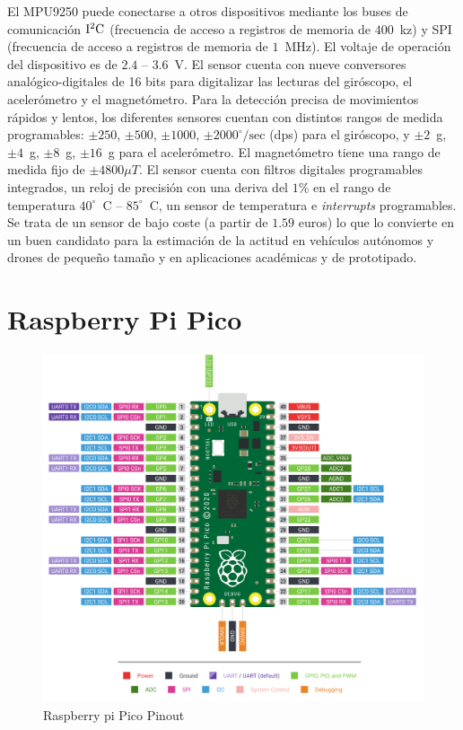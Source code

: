 \documentclass[a4paper,12pt]{book}
\begin{document}
El MPU9250 puede conectarse a otros dispositivos mediante los buses de comunicación $\rm{I^2C}$ (frecuencia de acceso a registros de memoria de $400$~kz) y SPI (frecuencia de acceso a registros de memoria de $1$~MHz). El voltaje de operación del dispositivo es de $2.4$ -- $3.6$~V. El sensor cuenta con nueve conversores analógico-digitales de 16 bits para digitalizar las lecturas del giróscopo, el acelerómetro y el magnetómetro. Para la detección precisa de movimientos rápidos y lentos, los diferentes sensores cuentan con distintos rangos de medida programables: $\pm 250$, $\pm 500$, $\pm 1000$, $\pm 2000^\circ/\mathrm{sec}$ (dps) para el giróscopo, y  $\pm 2$~g, $\pm 4$~g, $\pm 8$~g, $\pm 16$~g para el acelerómetro. El magnetómetro tiene una rango de medida fijo de $\pm4800 \mu T$. El sensor cuenta con filtros digitales programables integrados, un reloj de precisión con una deriva del $1\%$ en el rango de temperatura $40^\circ$~C -- $85^\circ$~C, un sensor de temperatura e \emph{interrupts} programables. Se trata de un sensor de bajo coste (a partir de $1.59$ euros) lo que lo convierte en un buen candidato para la estimación de la actitud en vehículos autónomos y drones de pequeño tamaño y en aplicaciones académicas y de prototipado.


\section{Raspberry Pi Pico}

\begin{figure}[!h]
    \centering
	\includegraphics[width=0.8\linewidth]{raspberry_pi_Pico-R3-Pinout-narrow.png}
 	\caption{Raspberry pi Pico Pinout}
 	\label{fig:raspberry_pinout}
\end{figure}
\end{document}
